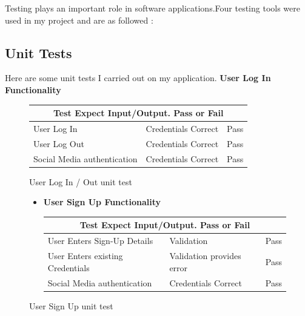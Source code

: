    Testing plays an important  role in software applications.Four testing tools were used in my project and  are as followed :
    
    
\subsection{Unit Tests}
Here are some unit tests I carried out on my application.
\textbf{User Log In Functionality} 
 
  \begin{figure}[H]

\begin{itemize}

\begin{tabular}{ |p{3.5cm}||p{3.5cm}|p{3.5cm}|  }
 \hline
 \multicolumn{3}{|c|}{Test Expect Input/Output.  Pass or Fail } \\
 \hline
 User Log In & Credentials Correct  & Pass\\
 \hline
 User Log Out & Credentials Correct  & Pass\\
 \hline
 Social Media authentication & Credentials Correct  & Pass\\
 \hline
\end{tabular}


\end{itemize}
 \caption{User Log In / Out  unit test }
\end{figure}

 \begin{figure}[H]

\begin{itemize}
\item    \textbf{User Sign  Up  Functionality}  

\begin{tabular}{ |p{3.5cm}||p{3.5cm}|p{3.5cm}|  }
 \hline
 \multicolumn{3}{|c|}{Test Expect Input/Output.  Pass or Fail } \\
 \hline
 User Enters Sign-Up Details  & Validation  & Pass\\
 \hline
 User Enters existing Credentials  & Validation provides error  & Pass\\

 \hline

 Social Media authentication & Credentials Correct  & Pass\\

 \hline
\end{tabular}


\end{itemize}

 \caption{User Sign  Up unit test }

\end{figure}





